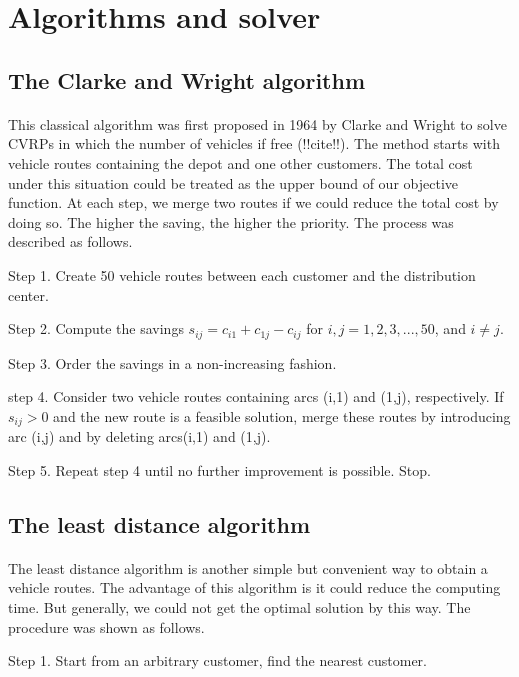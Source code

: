 \documentclass[12pt]{article}
\numberwithin{equation}{section}
\begin{document}
\section{Algorithms and solver}\label{algo}
	
	\subsection{The Clarke and Wright algorithm}
		\paragraph{}This classical algorithm was first proposed in 1964 by Clarke and Wright to solve CVRPs in which the number of vehicles if free (!!cite!!). The method starts with vehicle routes containing the depot and one other customers. The total cost under this situation could be treated as the upper bound of our objective function. At each step, we merge two routes if we could reduce the total cost by doing so. The higher the saving, the higher the priority. The process was described as follows.

Step 1. Create 50 vehicle routes between each customer and the distribution center.

Step 2. Compute the savings $s_{ij}=c_{i1}+c_{1j}-c_{ij}$ for $i,j = 1,2,3,...,50$, and $i \neq j$.

Step 3. Order the savings in a non-increasing fashion.

step 4. Consider two vehicle routes containing arcs (i,1) and (1,j), respectively. If $s_{ij}>0$ and the new route is a feasible solution, merge these routes by introducing arc (i,j) and by deleting arcs(i,1) and (1,j).

Step 5. Repeat step 4 until no further improvement is possible. Stop. 	
	
		\subsection{The least distance algorithm}
			\paragraph{}The least distance algorithm is another simple but convenient way to obtain a vehicle routes. The advantage of this algorithm is it could reduce the computing time. But generally, we could not get the optimal solution by this way. The procedure was shown as follows.
			
Step 1. Start from an arbitrary customer, find the nearest customer.
			
\end{document}
